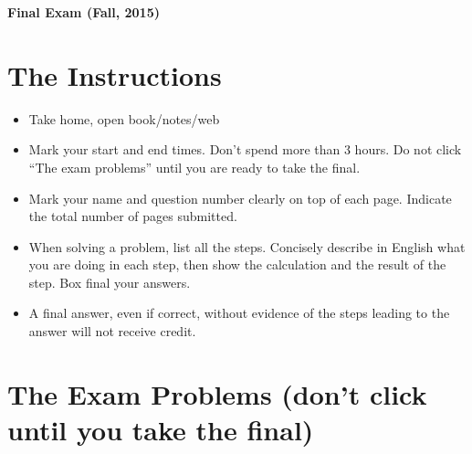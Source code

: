 \usepackage{html}

\begin{center}
{\Large \bf  Final Exam (Fall, 2015)}
\end{center}

\section{The Instructions}

\begin{itemize}
\item Take home, open book/notes/web
\item Mark your start and end times. Don't spend more than 3 hours.
  Do not click ``The exam problems'' until you are ready to take the 
  final.
\item Mark your name and question number clearly on top of each page.
  Indicate the total number of pages submitted.
\item When solving a problem, list all the steps. Concisely describe 
  in English what you are doing in each step, then show the calculation 
  and the result of the step. Box final your answers.
\item A final answer, even if correct, without evidence of the steps 
  leading to the answer will not receive credit.
\end{itemize}



\section{The Exam Problems (don't click until you take the final)}


